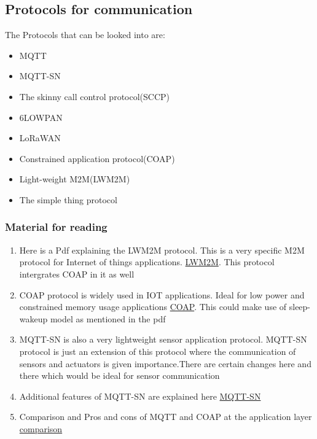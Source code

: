 \documentclass[16pt]{article}
\begin{document}
\vspace{10cm}


\subsection{Protocols for communication}

\vspace{0.5cm}

The Protocols that can be looked into are:

\begin{itemize}

\item
  MQTT
\item
  MQTT-SN
\item
  The skinny call control protocol(SCCP)
\item
  6LOWPAN
\item
  LoRaWAN
\item
  Constrained application protocol(COAP)
\item
  Light-weight M2M(LWM2M)
\item
  The simple thing protocol
\end{itemize}

\subsubsection{Material for reading}

\begin{enumerate}

\item
  Here is a Pdf explaining the LWM2M protocol. This is a very specific
  M2M protocol for Internet of things
  applications. {\color{red}\href{http://archive.ericsson.net/service/internet/picov/get?DocNo=1/28701-FGB101973}{LWM2M}}.
  This protocol intergrates COAP in it as well
\item
  COAP protocol is widely used in IOT applications. Ideal for low power
  and constrained memory usage applications
  {\color{red}\href{https://tools.ietf.org/html/draft-arkko-core-sleepy-sensors-01}{COAP}}.
  This could make use of sleep-wakeup model as mentioned in the pdf
\item
  MQTT-SN is also a very lightweight sensor application protocol.
  MQTT-SN protocol is just an extension of this protocol where the
  communication of sensors and actuators is given importance.There are
  certain changes here and there which would be ideal for sensor
  communication
\item
  Additional features of MQTT-SN are explained here
 {\color{red}\href{http://mqtt.org/new/wp-content/uploads/2009/06/MQTT-SN_spec_v1.2.pdf}{MQTT-SN}}
\item
  Comparison and Pros and cons of MQTT and COAP at the application layer
  {\color{red}\href{http://www.eclipse.org/community/eclipse_newsletter/2014/february/article2.php}{comparison}}
\end{enumerate}
\end{document}
